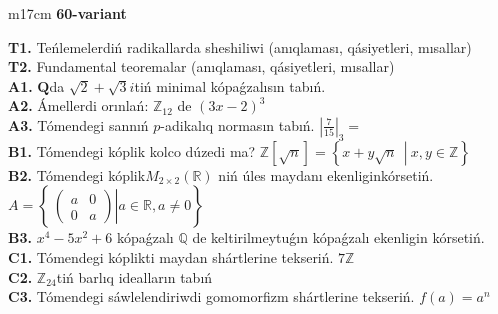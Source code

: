 \documentclass{article}
\begin{document}
\begin{tabular}{m{17cm}}
\textbf{60-variant}
\newline

\textbf{T1.} Teńlemelerdiń radikallarda sheshiliwi (anıqlaması, qásiyetleri, mısallar) \\
\textbf{T2.} Fundamental teoremalar (anıqlaması, qásiyetleri, mısallar) \\
\textbf{A1.} \(\mathbf{Q}\)da \(\sqrt{2} + \sqrt{3}i\)tiń minimal kópaǵzalısın tabıń. \\
\textbf{A2.} Ámellerdi orınlań: \(\mathbb{Z}_{12}\) de \((3x - 2)^{3}\) \\
\textbf{A3.} Tómendegi sannıń \(p\)-adikalıq normasın tabıń. \(|\frac{7}{15}|_{3} =\) \\
\textbf{B1.} Tómendegi kóplik kolco dúzedi ma? \(\mathbb{Z}\left\lbrack \sqrt{n} \right\rbrack = \left\{ x + y\sqrt{n}\ \ \left| \right.\ x,y \in \mathbb{Z} \right\}\) \\
\textbf{B2.} Tómendegi kóplik\(M_{2 \times 2}\left( \mathbb{R} \right)\) niń úles maydanı ekenliginkórsetiń. \(A = \left\{ \left. \ \begin{pmatrix}
a & 0 \\
0 & a
\end{pmatrix} \right|a\mathbb{\in R},a \neq 0 \right\}\) \\
\textbf{B3.} \(x^{4} - 5x^{2} + 6\) kópaǵzalı \(\mathbb{Q}\) de keltirilmeytuǵın kópaǵzalı ekenligin kórsetiń. \\
\textbf{C1.} Tómendegi kóplikti maydan shártlerine tekseriń. \(7\mathbb{Z}\) \\
\textbf{C2.} \(\mathbb{Z}_{24}\)tiń barlıq idealların tabıń \\
\textbf{C3.} Tómendegi sáwlelendiriwdi gomomorfizm shártlerine tekseriń. \(f(a) = a^{n}\) \\

\end{tabular}
\vspace{1cm}
\end{document}
